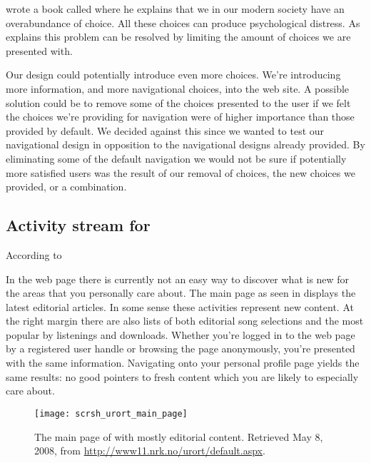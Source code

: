 \citet{schwartz04} wrote a book called
 where he explains that
we in our modern society have an overabundance of choice. All these choices
can produce psychological distress. As \citeauthor{schwartz04} explains this
problem can be resolved by limiting the amount of choices we are presented
with.

Our design could potentially introduce even more choices. We're
introducing more information, and more navigational choices, into the
\urort{} web site. A possible solution could be to remove some of the
choices presented to the user if we felt the choices we're providing
for navigation were of higher importance than those provided by
default. We decided against this since we wanted to test our navigational
design in opposition to the navigational designs already provided. By
eliminating some of the default navigation we would not be sure
if potentially more satisfied users was the result of our removal of
choices, the new choices we provided, or a combination.

\subsection{Activity stream for \urort{}}
\label{section:implementation.design.activity.stream}

According to 

In the \urort{} web page there is currently not an easy way to discover what
is new for the areas that you personally care about. The main page
as seen in 
displays the latest editorial articles. In some sense these activities
represent new content. At the right margin there are also lists of both
editorial song selections and the most popular by listenings and downloads.
Whether you're
logged in to the web page by a registered user handle or browsing the page
anonymously, you're presented with the same information. Navigating onto your
personal profile page yields the same results: no good pointers to fresh
content which you are likely to especially care about.

\begin{figure}
  \begin{whole}
    \texttt{[image: scrsh\_urort\_main\_page]}
    \caption[\urort{} Main Page]{
      The main page of \urort{} with mostly editorial content.
      Retrieved May 8, 2008, from
      \url{http://www11.nrk.no/urort/default.aspx}.
    }
    \label{figure:scrsh.urort.main.page}
  \end{whole}
\end{figure}

